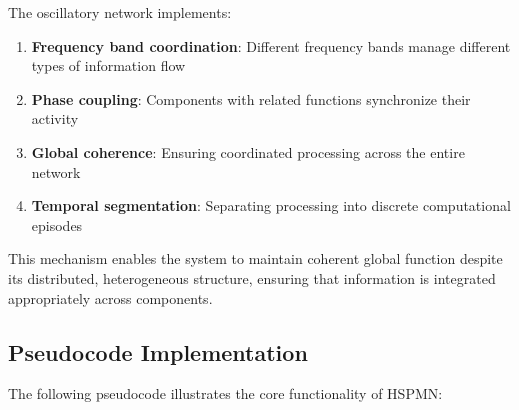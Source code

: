 \documentclass[11pt,a4paper,twocolumn]{article}
\begin{document}
The oscillatory network implements:

\begin{enumerate}
    \item \textbf{Frequency band coordination}: Different frequency bands manage different types of information flow
    \item \textbf{Phase coupling}: Components with related functions synchronize their activity
    \item \textbf{Global coherence}: Ensuring coordinated processing across the entire network
    \item \textbf{Temporal segmentation}: Separating processing into discrete computational episodes
\end{enumerate}

This mechanism enables the system to maintain coherent global function despite its distributed, heterogeneous structure, ensuring that information is integrated appropriately across components.
\onecolumn
\newpage
\subsection{Pseudocode Implementation}

The following pseudocode illustrates the core functionality of HSPMN:
\end{document}
